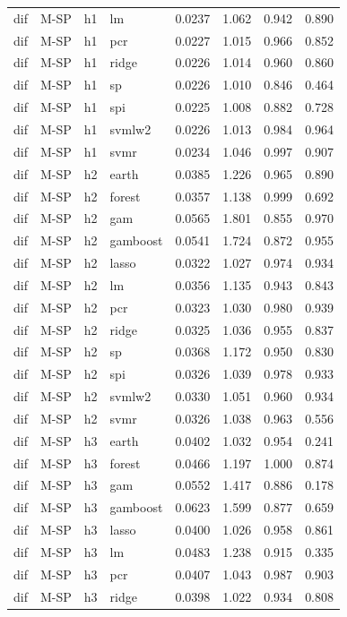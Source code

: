 \begin{ThreePartTable}
\begin{longtable}[t]{llclcccc}
dif & M-SP & h1 & lm & 0.0237 & 1.062 & 0.942 & 0.890\\
dif & M-SP & h1 & pcr & 0.0227 & 1.015 & 0.966 & 0.852\\
dif & M-SP & h1 & ridge & 0.0226 & 1.014 & 0.960 & 0.860\\
dif & M-SP & h1 & sp & 0.0226 & 1.010 & 0.846 & 0.464\\
dif & M-SP & h1 & spi & 0.0225 & 1.008 & 0.882 & 0.728\\
dif & M-SP & h1 & svmlw2 & 0.0226 & 1.013 & 0.984 & 0.964\\
dif & M-SP & h1 & svmr & 0.0234 & 1.046 & 0.997 & 0.907\\
\addlinespace
dif & M-SP & h2 & earth & 0.0385 & 1.226 & 0.965 & 0.890\\
dif & M-SP & h2 & forest & 0.0357 & 1.138 & 0.999 & 0.692\\
dif & M-SP & h2 & gam & 0.0565 & 1.801 & 0.855 & 0.970\\
dif & M-SP & h2 & gamboost & 0.0541 & 1.724 & 0.872 & 0.955\\
dif & M-SP & h2 & lasso & 0.0322 & 1.027 & 0.974 & 0.934\\
dif & M-SP & h2 & lm & 0.0356 & 1.135 & 0.943 & 0.843\\
dif & M-SP & h2 & pcr & 0.0323 & 1.030 & 0.980 & 0.939\\
dif & M-SP & h2 & ridge & 0.0325 & 1.036 & 0.955 & 0.837\\
dif & M-SP & h2 & sp & 0.0368 & 1.172 & 0.950 & 0.830\\
dif & M-SP & h2 & spi & 0.0326 & 1.039 & 0.978 & 0.933\\
dif & M-SP & h2 & svmlw2 & 0.0330 & 1.051 & 0.960 & 0.934\\
dif & M-SP & h2 & svmr & 0.0326 & 1.038 & 0.963 & 0.556\\
\addlinespace
dif & M-SP & h3 & earth & 0.0402 & 1.032 & 0.954 & 0.241\\
dif & M-SP & h3 & forest & 0.0466 & 1.197 & 1.000 & 0.874\\
dif & M-SP & h3 & gam & 0.0552 & 1.417 & 0.886 & 0.178\\
dif & M-SP & h3 & gamboost & 0.0623 & 1.599 & 0.877 & 0.659\\
dif & M-SP & h3 & lasso & 0.0400 & 1.026 & 0.958 & 0.861\\
dif & M-SP & h3 & lm & 0.0483 & 1.238 & 0.915 & 0.335\\
dif & M-SP & h3 & pcr & 0.0407 & 1.043 & 0.987 & 0.903\\
dif & M-SP & h3 & ridge & 0.0398 & 1.022 & 0.934 & 0.808\\

\end{longtable}
\end{ThreePartTable}
